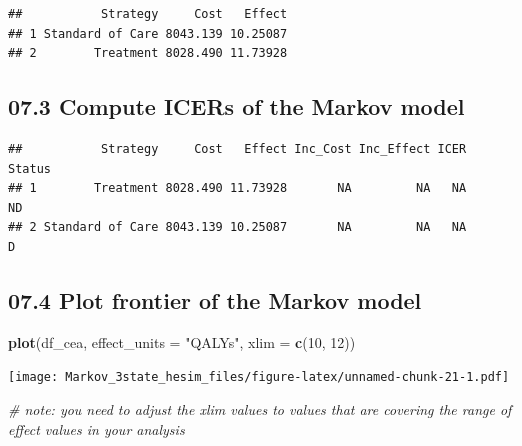 \documentclass[
]{article}
\newenvironment{Shaded}{\begin{snugshade}}{\end{snugshade}}
\newcommand{\CommentTok}[1]{\textcolor[rgb]{0.56,0.35,0.01}{\textit{#1}}}
\newcommand{\DataTypeTok}[1]{\textcolor[rgb]{0.13,0.29,0.53}{#1}}
\newcommand{\DecValTok}[1]{\textcolor[rgb]{0.00,0.00,0.81}{#1}}
\newcommand{\KeywordTok}[1]{\textcolor[rgb]{0.13,0.29,0.53}{\textbf{#1}}}
\newcommand{\NormalTok}[1]{#1}
\newcommand{\OperatorTok}[1]{\textcolor[rgb]{0.81,0.36,0.00}{\textbf{#1}}}
\newcommand{\StringTok}[1]{\textcolor[rgb]{0.31,0.60,0.02}{#1}}
\begin{document}
\begin{verbatim}
##           Strategy     Cost   Effect
## 1 Standard of Care 8043.139 10.25087
## 2        Treatment 8028.490 11.73928
\end{verbatim}

\hypertarget{compute-icers-of-the-markov-model}{%
\subsection{07.3 Compute ICERs of the Markov
model}\label{compute-icers-of-the-markov-model}}

\begin{Shaded}
\end{Shaded}

\begin{verbatim}
##           Strategy     Cost   Effect Inc_Cost Inc_Effect ICER Status
## 1        Treatment 8028.490 11.73928       NA         NA   NA     ND
## 2 Standard of Care 8043.139 10.25087       NA         NA   NA      D
\end{verbatim}

\hypertarget{plot-frontier-of-the-markov-model}{%
\subsection{07.4 Plot frontier of the Markov
model}\label{plot-frontier-of-the-markov-model}}

\begin{Shaded}
\begin{Highlighting}[]
\KeywordTok{plot}\NormalTok{(df_cea, }\DataTypeTok{effect_units =} \StringTok{"QALYs"}\NormalTok{, }\DataTypeTok{xlim =} \KeywordTok{c}\NormalTok{(}\DecValTok{10}\NormalTok{, }\DecValTok{12}\NormalTok{))}
\end{Highlighting}
\end{Shaded}

\texttt{[image: Markov\_3state\_hesim\_files/figure-latex/unnamed-chunk-21-1.pdf]}

\begin{Shaded}
\begin{Highlighting}[]
\CommentTok{# note: you need to adjust the xlim values to values that are covering the range of effect values in your analysis}
\end{Highlighting}
\end{Shaded}
\end{document}
